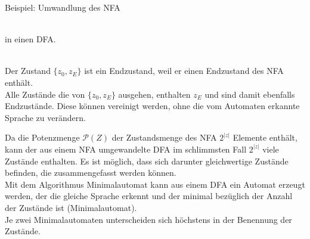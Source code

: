\documentclass[a4paper]{scrartcl}
\begin{document}
Beispiel: Umwandlung des NFA\\
\\
in einen DFA.\\
\\
Der Zustand $\{z_0,z_E\}$ ist ein Endzustand, weil er einen Endzustand des NFA enthält.\\
Alle Zustände die von $\{z_0,z_E\}$ ausgehen, enthalten $z_E$ und sind damit ebenfalls Endzustände. Diese können vereinigt werden, ohne  die vom Automaten erkannte Sprache zu verändern.

Da die Potenzmenge $\mathcal{P}(Z)$ der Zustandsmenge des NFA $2^{\lvert z \rvert}$ Elemente enthält, kann der aus einem NFA umgewandelte DFA im schlimmsten Fall $2^{\lvert z \rvert}$ viele Zustände enthalten. Es ist möglich, dass sich darunter gleichwertige Zustände befinden, die zusammengefasst werden können.\\
Mit dem Algorithmus Minimalautomat kann aus einem DFA ein Automat erzeugt werden, der die gleiche Sprache erkennt und der minimal bezüglich der Anzahl der Zustände ist (Minimalautomat).\\
Je zwei Minimalautomaten unterscheiden sich höchstens in der Benennung der Zustände.
\end{document}
